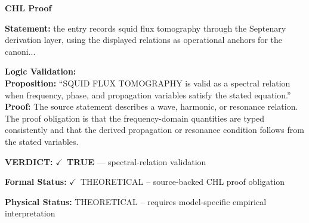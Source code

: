 \vspace{0.45em}
\noindent\textbf{CHL Proof}\par
\textbf{Statement:} the entry records squid flux tomography through the Septenary derivation layer, using
the displayed relations as operational anchors for the canoni...

\textbf{Logic Validation:}\\
\textbf{Proposition:} ``SQUID FLUX TOMOGRAPHY is valid as a spectral relation when frequency, phase, and
propagation variables satisfy the stated equation.''\\
\textbf{Proof:} The source statement describes a wave, harmonic, or resonance relation. The proof
obligation is that the frequency-domain quantities are typed consistently and that the
derived propagation or resonance condition follows from the stated variables.

\textbf{VERDICT:} \ensuremath{\checkmark}\ \textbf{TRUE} --- spectral-relation validation

\textbf{Formal Status:} \ensuremath{\checkmark}\ THEORETICAL -- source-backed CHL proof obligation

\textbf{Physical Status:} THEORETICAL -- requires model-specific empirical interpretation
\par\vspace{0.45em}
\par
\ifTZPDarkEdition
{}
\fi
\endgroup
\endgroup
